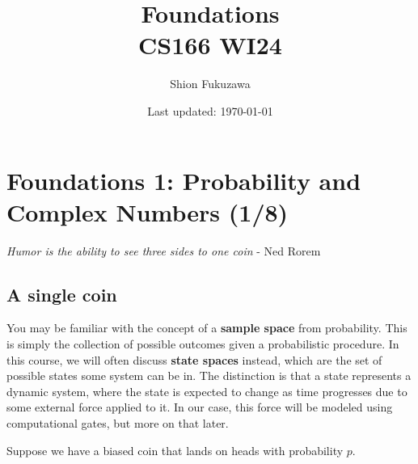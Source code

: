 \documentclass[letterpaper, 12pt]{article}
\newcommand{\1}{\mathds{1}}	%
\theoremstyle{definition}
\begin{document}

\title{Foundations \\[1em]
\normalsize CS166 WI24}


\author{\normalsize Shion Fukuzawa}
\date{\normalsize\vspace{-1ex} Last updated: \today}






\section[Foundations 1 -- {\it Probability and Complex Numbers}]{Foundations 1: Probability and Complex Numbers (1/8)}

\textit{Humor is the ability to see three sides to one coin} \small{- Ned Rorem}


\subsection{A single coin}

You may be familiar with the concept of a \textbf{sample space} from probability. This is simply the collection of possible outcomes given a probabilistic procedure. In this course, we will often discuss \textbf{state spaces} instead, which are the set of possible states some system can be in. The distinction is that a state represents a dynamic system, where the state is expected to change as time progresses due to some external force applied to it. In our case, this force will be modeled using computational gates, but more on that later. 

Suppose we have a biased coin that lands on heads with probability $p$. 
\end{document}
